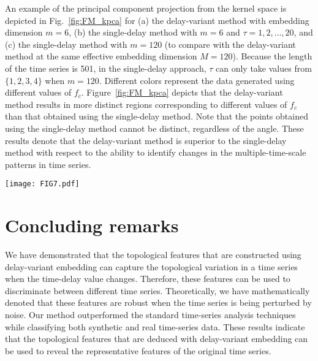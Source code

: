 \documentclass[twocolumn,pre,amsmath,amssymb]{revtex4-1}
\begin{document}
An example of the principal component projection from the kernel space is depicted in Fig.~\ref{fig:FM_kpca} for 
(a) the delay-variant method with embedding dimension $m=6$,
(b) the single-delay method with $m=6$ and $\tau=1,2,\ldots,20$,
and (c) the single-delay method with $m=120$
(to compare with the delay-variant method at the same effective embedding dimension $M=120$).
Because the length of the time series is 501, in the single-delay approach, 
$\tau$ can only take values from $\{1, 2, 3, 4\}$ when $m=120$.
Different colors represent the data generated using different values of $f_c$.
Figure~\ref{fig:FM_kpca} depicts that the delay-variant method results in more distinct regions 
corresponding to different values of $f_c$ than that obtained using the single-delay method.
Note that the points obtained using the single-delay method cannot be distinct, regardless of the angle.
These results denote that the delay-variant method is superior to the single-delay method 
with respect to the ability to identify changes in the multiple-time-scale patterns in time series.
\begin{figure*}
	\texttt{[image: FIG7.pdf]}
	
	\protect\caption{Projection of the features of synthetic frequency-modulated time series 
	from kernel space to principal components for 
	    (a) the delay-variant method with embedding dimension $m=6$,
        (b) the single-delay method with $m=6$ and $\tau=1,2,\ldots,20$,
        and (c) the single-delay method with $m=120$
        (for performing comparison with the delay-variant method at the same effective embedding dimension $M=120$)
        and $\tau=1,2,3,4$.
		Different colors represent the data generated using different values of the carrier frequency $f_c$.}
        \label{fig:FM_kpca}
\end{figure*}
\section{Concluding remarks}
We have demonstrated that the topological features that are constructed using delay-variant embedding 
can capture the topological variation in a time series when the time-delay value changes. 
Therefore, these features can be used to discriminate between different time series.
Theoretically, we have mathematically denoted that these features are robust 
when the time series is being perturbed by noise.
Our method outperformed the standard time-series analysis techniques while classifying both synthetic and real time-series data.
These results indicate that the topological features that are deduced with
delay-variant embedding can be used to reveal the representative features of the original time series.
\end{document}
